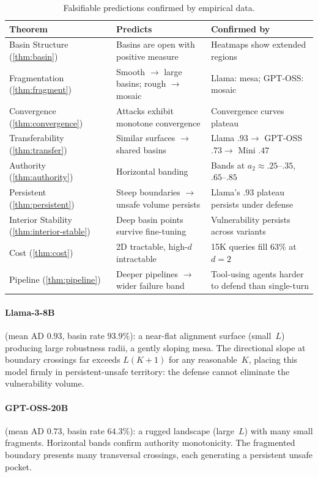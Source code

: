 \documentclass[11pt]{article}
\begin{document}
\begin{table}[t]
\centering
\small
\caption{Falsifiable predictions confirmed by empirical data.}
\label{tab:correspondence}
\begin{tabular}{@{}p{3.0cm}p{4.5cm}p{4.5cm}@{}}
\toprule
\textbf{Theorem} & \textbf{Predicts} & \textbf{Confirmed by} \\
\midrule
Basin Structure (\ref{thm:basin})
  & Basins are open with positive measure
  & Heatmaps show extended regions \\[3pt]
Fragmentation (\ref{thm:fragment})
  & Smooth $\to$ large basins; rough $\to$ mosaic
  & Llama: mesa; GPT-OSS: mosaic \\[3pt]
Convergence (\ref{thm:convergence})
  & Attacks exhibit monotone convergence
  & Convergence curves plateau \\[3pt]
Transferability (\ref{thm:transfer})
  & Similar surfaces $\to$ shared basins
  & Llama $.93 \to$ GPT-OSS $.73 \to$ Mini $.47$ \\[3pt]
Authority (\ref{thm:authority})
  & Horizontal banding
  & Bands at $a_2 \approx .25$--$.35$, $.65$--$.85$ \\[3pt]
Persistent (\ref{thm:persistent})
  & Steep boundaries $\to$ unsafe volume persists
  & Llama's $.93$ plateau persists under defense \\[3pt]
Interior Stability (\ref{thm:interior-stable})
  & Deep basin points survive fine-tuning
  & Vulnerability persists across variants \\[3pt]
Cost (\ref{thm:cost})
  & 2D tractable, high-$d$ intractable
  & 15K queries fill 63\% at $d\!=\!2$ \\[3pt]
Pipeline (\ref{thm:pipeline})
  & Deeper pipelines $\to$ wider failure band
  & Tool-using agents harder to defend than single-turn \\
\bottomrule
\end{tabular}
\end{table}

\paragraph{Llama-3-8B} (mean AD $0.93$, basin rate $93.9\%$): a
near-flat alignment surface (small~$L$) producing large robustness
radii, a gently sloping mesa. The directional slope at boundary
crossings far exceeds $L(K{+}1)$ for any reasonable~$K$, placing
this model firmly in persistent-unsafe territory: the defense cannot
eliminate the vulnerability volume.

\paragraph{GPT-OSS-20B} (mean AD $0.73$, basin rate $64.3\%$): a
rugged landscape (large~$L$) with many small fragments. Horizontal
bands confirm authority monotonicity. The fragmented boundary presents
many transversal crossings, each generating a persistent unsafe pocket.
\end{document}
